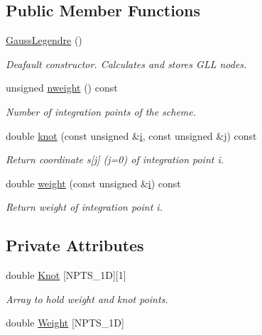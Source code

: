 \subsection*{Public Member Functions}
\begin{DoxyCompactItemize}
\item 
\hyperlink{classoomph_1_1GaussLegendre_3_011_00_01NPTS__1D_01_4_a3b66c486cf487307e25bb3260e35e312}{Gauss\+Legendre} ()
\begin{DoxyCompactList}\small\item\em Deafault constructor. Calculates and stores G\+LL nodes. \end{DoxyCompactList}\item 
unsigned \hyperlink{classoomph_1_1GaussLegendre_3_011_00_01NPTS__1D_01_4_ad8b2aad0d4f7aa606fd0d89ee44fdd14}{nweight} () const
\begin{DoxyCompactList}\small\item\em Number of integration points of the scheme. \end{DoxyCompactList}\item 
double \hyperlink{classoomph_1_1GaussLegendre_3_011_00_01NPTS__1D_01_4_a315e14d529ea5e9945e0a23da4fa9790}{knot} (const unsigned \&\hyperlink{cfortran_8h_adb50e893b86b3e55e751a42eab3cba82}{i}, const unsigned \&j) const
\begin{DoxyCompactList}\small\item\em Return coordinate s\mbox{[}j\mbox{]} (j=0) of integration point i. \end{DoxyCompactList}\item 
double \hyperlink{classoomph_1_1GaussLegendre_3_011_00_01NPTS__1D_01_4_a264bcf0bdeb1738722da6d157eb140e7}{weight} (const unsigned \&\hyperlink{cfortran_8h_adb50e893b86b3e55e751a42eab3cba82}{i}) const
\begin{DoxyCompactList}\small\item\em Return weight of integration point i. \end{DoxyCompactList}\end{DoxyCompactItemize}
\subsection*{Private Attributes}
\begin{DoxyCompactItemize}
\item 
double \hyperlink{classoomph_1_1GaussLegendre_3_011_00_01NPTS__1D_01_4_aa4ac5f2d0e456112d4d518400c89ea3a}{Knot} \mbox{[}N\+P\+T\+S\+\_\+1D\mbox{]}\mbox{[}1\mbox{]}
\begin{DoxyCompactList}\small\item\em Array to hold weight and knot points. \end{DoxyCompactList}\item 
double \hyperlink{classoomph_1_1GaussLegendre_3_011_00_01NPTS__1D_01_4_a3c07e73cbed3ba2fa1dacc67287609ea}{Weight} \mbox{[}N\+P\+T\+S\+\_\+1D\mbox{]}
\end{DoxyCompactItemize}
